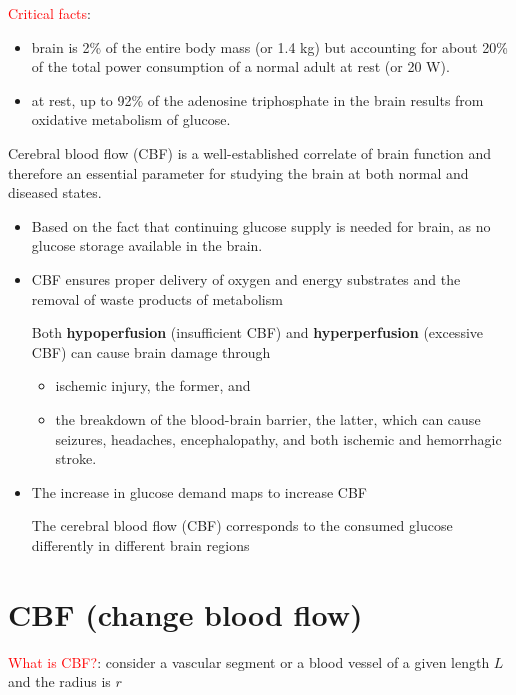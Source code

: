 \textcolor{red}{Critical facts}: 
\begin{itemize}
  \item  brain is 2\% of the entire body mass (or   1.4 kg) but accounting for
  about 20\% of the total power consumption of a normal adult at rest (or  
  20 W).
  
  \item at rest, up to 92\% of the adenosine triphosphate in the brain results
  from oxidative metabolism of glucose.
\end{itemize}


Cerebral blood flow (CBF) is a well-established correlate of brain function and
therefore an essential parameter for studying the brain at both normal and
diseased states.
\begin{itemize}
  \item Based on the fact that continuing glucose supply is needed for brain, as
  no glucose storage available in the brain.

  \item CBF ensures proper delivery of oxygen and energy substrates and the
  removal of waste products of metabolism

Both {\bf hypoperfusion} (insufficient CBF) and {\bf hyperperfusion} (excessive
CBF) can cause brain damage through
\begin{itemize}
  \item    ischemic injury, the former, and 
  
  \item the breakdown of the blood-brain barrier, the latter, which can cause
  seizures, headaches, encephalopathy, and both ischemic and hemorrhagic stroke.
\end{itemize}

  \item The increase in glucose demand maps to increase CBF
  
The cerebral blood flow (CBF) corresponds to the consumed glucose differently in
different brain regions

\end{itemize}


\section{CBF (change blood flow)}
\label{sec:CBF}
\label{sec:CBF-cerebral-blood-flow}

\textcolor{red}{What is CBF?}:  consider a vascular segment or a blood vessel of
a given length $L$ and the radius is $r$

